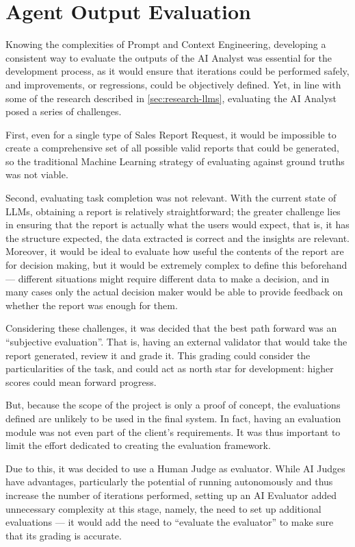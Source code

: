 \documentclass[a4paper]{report}
\begin{document}
\section{Agent Output Evaluation}
\label{sec:agent-evals}

Knowing the complexities of Prompt and Context Engineering, developing a consistent way to evaluate the outputs of the AI Analyst was essential for the development process, as it would ensure that iterations could be performed safely, and improvements, or regressions, could be objectively defined. Yet, in line with some of the research described in \autoref{sec:research-llms}, evaluating the AI Analyst posed a series of challenges.

First, even for a single type of Sales Report Request, it would be impossible to create a comprehensive set of all possible valid reports that could be generated, so the traditional Machine Learning strategy of evaluating against ground truths was not viable.

Second, evaluating task completion was not relevant. With the current state of LLMs, obtaining a report is relatively straightforward; the greater challenge lies in ensuring that the report is actually what the users would expect, that is, it has the structure expected, the data extracted is correct and the insights are relevant. Moreover, it would be ideal to evaluate how useful the contents of the report are for decision making, but it would be extremely complex to define this beforehand --- different situations might require different data to make a decision, and in many cases only the actual decision maker would be able to provide feedback on whether the report was enough for them.

Considering these challenges, it was decided that the best path forward was an ``subjective evaluation''. That is, having an external validator that would take the report generated, review it and grade it. This grading could consider the particularities of the task, and could act as north star for development: higher scores could mean forward progress.

But, because the scope of the project is only a proof of concept, the evaluations defined are unlikely to be used in the final system. In fact, having an evaluation module was not even part of the client's requirements. It was thus important to limit the effort dedicated to creating the evaluation framework.

Due to this, it was decided to use a Human Judge as evaluator. While AI Judges have advantages, particularly the potential of running autonomously and thus increase the number of iterations performed, setting up an AI Evaluator added unnecessary complexity at this stage, namely, the need to set up additional evaluations --- it would add the need to ``evaluate the evaluator'' to make sure that its grading is accurate.
\end{document}
